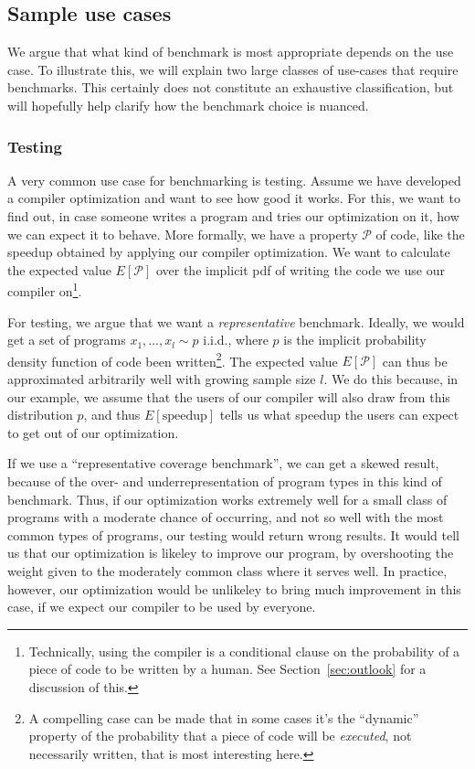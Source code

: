 \subsection{Sample use cases}

We argue that what kind of benchmark is most appropriate depends on the use case. To illustrate this, we will explain two large classes of use-cases that require benchmarks. This certainly does not constitute an exhaustive classification, but will hopefully help clarify how the benchmark choice is nuanced.

\subsubsection{Testing}
\label{sec:testing}

A very common use case for benchmarking is testing. Assume we have developed a compiler optimization and want to see how good it works.
For this, we want to find out, in case someone writes a program and tries our optimization on it, how we can expect it to behave.
More formally, we have a property $\mathcal{P}$ of code, like the speedup obtained by applying our compiler optimization.
We want to calculate the expected value $E[\mathcal{P}]$ over the implicit pdf of writing the code we use our compiler on\footnote{Technically, using the compiler is a conditional clause on the probability of a piece of code to be written by a human. See Section~\ref{sec:outlook} for a discussion of this.}.

For testing, we argue that we want a \emph{representative} benchmark. Ideally, we would get a set of programs $x_1, \ldots, x_l \sim p$ i.i.d., where $p$ is the implicit probability density function of code been written\footnote{A compelling case can be made that in some cases it's the ``dynamic'' property of the probability that a piece of code will be \emph{executed}, not necessarily written, that is most interesting here.}.
The expected value $E[\mathcal{P}]$ can thus be approximated arbitrarily well with growing sample size $l$.
We do this because, in our example, we assume that the users of our compiler will also draw from this distribution $p$, and thus $E[\text{speedup}]$ tells us what speedup the users can expect to get out of our optimization.

If we use a ``representative coverage benchmark'', we can get a skewed result, because of the over- and underrepresentation of program types in this kind of benchmark.
Thus, if our optimization works extremely well for a small class of programs with a moderate chance of occurring, and not so well with the most common types of programs, our testing would return wrong results.
It would tell us that our optimization is likeley to improve our program, by overshooting the weight given to the moderately common class where it serves well.
In practice, however, our optimization would be unlikeley to bring much improvement in this case, if we expect our compiler to be used by everyone.

